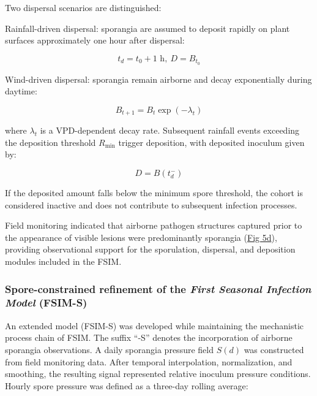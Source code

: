 \documentclass[
]{article}
\begin{document}
Two dispersal scenarios are distinguished:

Rainfall-driven dispersal: sporangia are assumed to deposit rapidly on
plant surfaces approximately one hour after dispersal:

\begin{equation}
t_{d} = t_{0} + 1\text{~h},\ D = B_{t_{0}}
\tag{2}
\end{equation}

Wind-driven dispersal: sporangia remain airborne and decay exponentially
during daytime:

\begin{equation}
B_{t + 1} = B_{t}\exp( - \lambda_{t})
\tag{3}
\end{equation}

where \(\lambda_{t}\) is a VPD-dependent decay rate. Subsequent
rainfall events exceeding the deposition threshold
\(R_{\min}\) trigger deposition, with deposited inoculum given by:

\begin{equation}
D = B(t_{d}^{-})
\tag{4}
\end{equation}

If the deposited amount falls below the minimum spore threshold, the
cohort is considered inactive and does not contribute to subsequent
infection processes.

Field monitoring indicated that airborne pathogen structures captured
prior to the appearance of visible lesions were predominantly sporangia
(\hyperref[_Ref214187767]{Fig 5d}), providing observational support for
the sporulation, dispersal, and deposition modules included in the FSIM.

\subsubsection{\texorpdfstring{Spore-constrained refinement of the
\emph{First Seasonal Infection Model}
(FSIM-S)}{Spore-constrained refinement of the First Seasonal Infection Model (FSIM-S)}}\label{spore-constrained-refinement-of-the-first-seasonal-infection-model-fsim-s}

An extended model (FSIM-S) was developed while maintaining the
mechanistic process chain of FSIM. The suffix ``-S'' denotes the
incorporation of airborne sporangia observations. A daily sporangia
pressure field \(S(d)\) was constructed from field monitoring data. After
temporal interpolation, normalization, and smoothing, the resulting
signal represented relative inoculum pressure conditions. Hourly spore
pressure was defined as a three-day rolling average:
\end{document}

